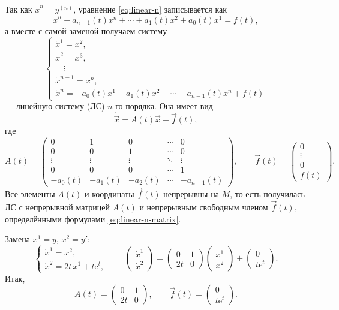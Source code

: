 \documentclass[12pt,a4paper]{article}
\numberwithin{equation}{section}
\newcommand{\vect}[1]{\vec{#1}}
\newcommand{\e}{\mathrm{e}}
\begin{document}
Так как \(\dot x^n=y^{(n)}\), уравнение \eqref{eq:linear-n} записывается как
\[
\dot x^n+a_{n-1}(t)x^n+\cdots+a_1(t)x^2+a_0(t)x^1=f(t),
\]
а вместе с самой заменой получаем систему
\begin{equation}
\begin{cases}
\dot x^1=x^2,\\
\dot x^2=x^3,\\
\quad\vdots\\
\dot x^{n-1}=x^n,\\
\dot x^n=-a_0(t)x^1-a_1(t)x^2-\cdots-a_{n-1}(t)x^n+f(t)
\end{cases}
\label{eq:linear-n-system}
\end{equation}
--- линейную систему (ЛС) \(n\)-го порядка. Она имеет вид
\[
\dot{\vect{x}}=A(t)\vect{x}+\vect{f}(t),
\]
где
\begin{equation}
A(t)=
\begin{pmatrix}
0&1&0&\cdots&0\\
0&0&1&\cdots&0\\
\vdots&\vdots&\vdots&\ddots&\vdots\\
0&0&0&\cdots&1\\
-a_0(t)&-a_1(t)&-a_2(t)&\cdots&-a_{n-1}(t)
\end{pmatrix},
\qquad
\vect{f}(t)=
\begin{pmatrix}0\\\vdots\\0\\f(t)\end{pmatrix}.
\label{eq:linear-n-matrix}
\end{equation}
Все элементы \(A(t)\) и координаты \(\vect{f}(t)\) непрерывны на \(M\), то есть получилась ЛС с непрерывной матрицей \(A(t)\) и непрерывным свободным членом \(\vect{f}(t)\), определёнными формулами \eqref{eq:linear-n-matrix}.

\begin{exampleHSE}[\(y''-2ty=t\e^{t}\)]
Замена \(x^1=y\), \(x^2=y'\):
\[
\begin{cases}
\dot x^1=x^2,\\
\dot x^2=2t\,x^1+t\e^{t},
\end{cases}
\qquad
\begin{pmatrix}\dot x^1\\\dot x^2\end{pmatrix}
=
\begin{pmatrix}0&1\\2t&0\end{pmatrix}
\begin{pmatrix}x^1\\x^2\end{pmatrix}
+
\begin{pmatrix}0\\t\e^{t}\end{pmatrix}.
\]
Итак,
\[
A(t)=\begin{pmatrix}0&1\\2t&0\end{pmatrix},\qquad
\vect{f}(t)=\begin{pmatrix}0\\t\e^{t}\end{pmatrix}.
\]
\end{exampleHSE}
\end{document}
